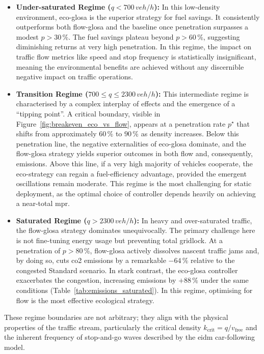 \begin{itemize}
    \item \textbf{Under-saturated Regime ($q < 700\,\unit{veh/h}$):} In this low-density environment, \ac{eco-glosa} is the superior strategy for fuel savings. It consistently outperforms both \ac{flow-glosa} and the baseline once penetration surpasses a modest $p > 30\,\%$. The fuel savings plateau beyond $p > 60\,\%$, suggesting diminishing returns at very high penetration. In this regime, the impact on traffic flow metrics like speed and stop frequency is statistically insignificant, meaning the environmental benefits are achieved without any discernible negative impact on traffic operations.

    \item \textbf{Transition Regime ($700 \le q \le 2300\,\unit{veh/h}$):} This intermediate regime is characterised by a complex interplay of effects and the emergence of a \enquote{tipping point}. A critical boundary, visible in Figure~\ref{fig:breakeven_eco_vs_flow}, appears at a penetration rate $p^\star$ that shifts from approximately $60\,\%$ to $90\,\%$ as density increases. Below this penetration line, the negative externalities of \ac{eco-glosa} dominate, and the \ac{flow-glosa} strategy yields superior outcomes in both flow and, consequently, emissions. Above this line, if a very high majority of vehicles cooperate, the eco-strategy can regain a fuel-efficiency advantage, provided the emergent oscillations remain moderate. This regime is the most challenging for static deployment, as the optimal choice of controller depends heavily on achieving a near-total \ac{mpr}.

    \item \textbf{Saturated Regime ($q > 2300\,\unit{veh/h}$):} In heavy and over-saturated traffic, the \ac{flow-glosa} strategy dominates unequivocally. The primary challenge here is not fine-tuning energy usage but preventing total gridlock. At a penetration of $p > 80\,\%$, \ac{flow-glosa} actively dissolves nascent traffic jams and, by doing so, cuts \ac{co2} emissions by a remarkable $-64\,\%$ relative to the congested Standard scenario. In stark contrast, the \ac{eco-glosa} controller exacerbates the congestion, increasing emissions by $+88\,\%$ under the same conditions (Table~\ref{tab:emissions_saturated}). In this regime, optimising for flow is the most effective ecological strategy.
\end{itemize}

These regime boundaries are not arbitrary; they align with the physical properties of the traffic stream, particularly the critical density $k_\mathrm{crit}=q/v_\mathrm{free}$ and the inherent frequency of stop-and-go waves described by the \ac{eidm} car-following model.


